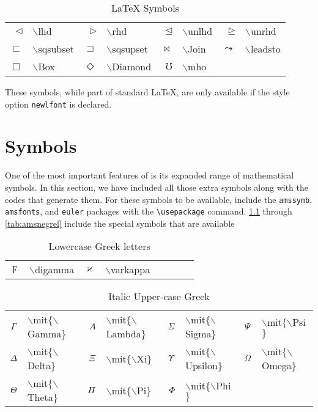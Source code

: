 \begin{table}
\centering
\caption{\LaTeX{} Symbols}
\label{tab:symx}
\vspace{\baselineskip}
\tablerule
\begin{tabular}{rlrlrlrl}
$\lhd$&$\backslash$lhd&
$\rhd$&$\backslash$rhd&
$\unlhd$&$\backslash$unlhd&
$\unrhd$&$\backslash$unrhd\\
$\sqsubset$&$\backslash$sqsubset&
$\sqsupset$&$\backslash$sqsupset&
$\Join$&$\backslash$Join&
$\leadsto$&$\backslash$leadsto\\
$\Box$&$\backslash$Box&
$\Diamond$&$\backslash$Diamond&
$\mho$&$\backslash$mho&\\
\end{tabular}\par
These symbols, while part of standard \LaTeX{}, are only available
if the style option \verb|newlfont| is declared.
\vspace{\baselineskip}
\tablerule
\end{table}
 
\chapter{\amslatex{} Symbols}
One of the most important features of \amslatex{} is its expanded range
of mathematical symbols.
In this section, we have included all those extra symbols along with the
codes that generate them.  For these symbols to be available, include the
{\tt amssymb}, {\tt amsfonts}, and {\tt euler} packages with the \verb+\usepackage+ command.
\ref{tab:lcg} through \ref{tab:amsnegrel} include the special symbols
that are available
 
\begin{table}
\centering
\caption{Lowercase Greek letters}\label{tab:lcg}
\vspace{\baselineskip}
\tablerule
\begin{tabular}{rlrlrlrl}
$\digamma$&$\backslash$digamma&
$\varkappa$&$\backslash$varkappa\\
\end{tabular}
\tablerule
\end{table}
 
\begin{table}
\centering
\caption{Italic Upper-case Greek}
\vspace{\baselineskip}
\tablerule
\begin{tabular}{rlrlrlrl}
$\mit{\Gamma}$&$\backslash$mit$\{\backslash$Gamma$\}$&
$\mit{\Lambda}$&$\backslash$mit$\{\backslash$Lambda$\}$&
$\mit{\Sigma}$&$\backslash$mit$\{\backslash$Sigma$\}$&
$\mit{\Psi}$&$\backslash$mit$\{\backslash$Psi$\}$\\
$\mit{\Delta}$&$\backslash$mit$\{\backslash$Delta$\}$&
$\mit{\Xi}$&$\backslash$mit$\{\backslash$Xi$\}$&
$\mit{\Upsilon}$&$\backslash$mit$\{\backslash$Upsilon$\}$&
$\mit{\Omega}$&$\backslash$mit$\{\backslash$Omega$\}$\\
$\mit{\Theta}$&$\backslash$mit$\{\backslash$Theta$\}$&
$\mit{\Pi}$&$\backslash$mit$\{\backslash$Pi$\}$&
$\mit{\Phi}$&$\backslash$mit$\{\backslash$Phi$\}$&
\end{tabular}
\tablerule
\end{table}
 
